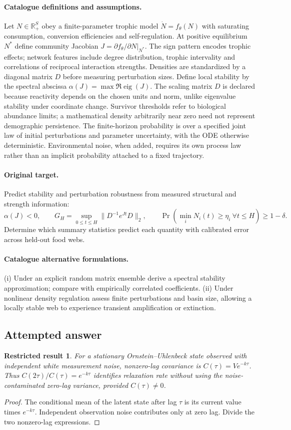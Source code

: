 \documentclass[11pt]{article}
\newcommand{\R}{\mathbb R}
\providecommand{\R}{\mathbb R}
\newtheorem{attemptresult}{Restricted result}[section]
\begin{document}
\paragraph{Catalogue definitions and assumptions.}
Let $N\in\R_+^S$ obey a finite-parameter trophic model $\dot N=f_\theta(N)$ with saturating consumption, conversion efficiencies and self-regulation. At positive equilibrium $N^*$ define community Jacobian $J=\partial f_\theta/\partial N|_{N^*}$. The sign pattern encodes trophic effects; network features include degree distribution, trophic intervality and correlations of reciprocal interaction strengths. Densities are standardized by a diagonal matrix $D$ before measuring perturbation sizes. Define local stability by the spectral abscissa $\alpha(J)=\max\Re\operatorname{eig}(J)$. The scaling matrix $D$ is declared because reactivity depends on the chosen units and norm, unlike eigenvalue stability under coordinate change. Survivor thresholds refer to biological abundance limits; a mathematical density arbitrarily near zero need not represent demographic persistence. The finite-horizon probability is over a specified joint law of initial perturbations and parameter uncertainty, with the ODE otherwise deterministic. Environmental noise, when added, requires its own process law rather than an implicit probability attached to a fixed trajectory.
\paragraph{Original target.}
Predict stability and perturbation robustness from measured structural and strength information:
\[
 \alpha(J)<0,\qquad
 G_H=\sup_{0\le t\le H}\|D^{-1}e^{Jt}D\|_2,
 \qquad \Pr(\min_iN_i(t)\ge\eta_i\ \forall t\le H)\ge1-\delta.
\]
Determine which summary statistics predict each quantity with calibrated error across held-out food webs.
\paragraph{Catalogue alternative formulations.}
(i) Under an explicit random matrix ensemble derive a spectral stability approximation; compare with empirically correlated coefficients. (ii) Under nonlinear density regulation assess finite perturbations and basin size, allowing a locally stable web to experience transient amplification or extinction.
\subsection{Attempted answer}
\begin{attemptresult}
For a stationary Ornstein--Uhlenbeck state observed with independent white measurement noise, nonzero-lag covariance is $C(\tau)=Ve^{-k\tau}$. Thus $C(2\tau)/C(\tau)=e^{-k\tau}$ identifies relaxation rate without using the noise-contaminated zero-lag variance, provided $C(\tau)\ne0$.
\end{attemptresult}
\begin{proof}
The conditional mean of the latent state after lag $\tau$ is its current value times $e^{-k\tau}$. Independent observation noise contributes only at zero lag. Divide the two nonzero-lag expressions.
\end{proof}
\end{document}
